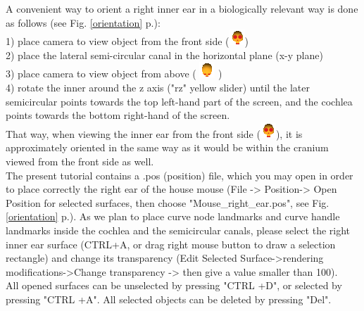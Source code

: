 \documentclass[12pt, a4paper]{book}
\begin{document}
A convenient way to orient a right inner ear in a biologically relevant way is done as follows (see Fig. \ref{orientation} p.\pageref{orientation}):\\
1) place camera to view object from the front side (\includegraphics[scale=0.7]{../images/06/camera/camera_front.png})\\
2) place the lateral semi-circular canal in the horizontal plane (x-y plane)\\
3) place camera  to view object from above ( \includegraphics[scale=0.7]{../images/06/camera/camera_above.png} )\\
4) rotate the inner around the z axis ("rz" yellow slider) until the later semicircular points towards the top left-hand part of the screen, and the cochlea points towards the bottom right-hand of the screen.\\
That way, when viewing the inner ear from the front side (\includegraphics[scale=0.7]{../images/06/camera/camera_front.png}), it is approximately oriented in the same way as it would be within the cranium viewed from the front side as well.\\

The present tutorial contains a .pos (position) file, which you may open in order to place correctly the right ear of the house
mouse (File -> Position-> Open Position for selected surfaces, then choose "Mouse\_right\_ear.pos", see Fig. \ref{orientation} p.\pageref{orientation}). As we plan to place curve node landmarks and curve handle landmarks inside the cochlea and the semicircular canals, please select the right inner ear surface (CTRL+A, or drag right mouse button to draw a selection rectangle) and change its transparency (Edit Selected Surface->rendering modifications->Change transparency -> then give a value smaller than 100).\\
All opened surfaces can be unselected by pressing "CTRL +D", or selected by pressing "CTRL +A". All selected objects can be deleted by pressing "Del".
\end{document}

